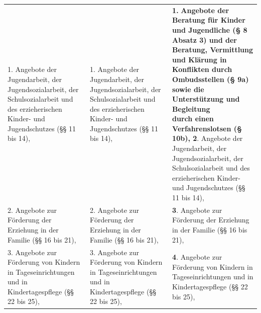 \documentclass[10pt,a4paper,landscape]{article}
\begin{document}
\begin{longtable}{|L{8.2cm}|L{8.2cm}|L{8.2cm}|}
1.  \newline Angebote der Jugendarbeit, der  \newline Jugendsozialarbeit, der Schulsozialarbeit  \newline und des erzieherischen Kinder- und  \newline Jugendschutzes (\S{}\S{} 11 bis 14), & 1.  \newline Angebote der Jugendarbeit, der  \newline Jugendsozialarbeit, der Schulsozialarbeit  \newline und des erzieherischen Kinder- und  \newline Jugendschutzes (\S{}\S{} 11 bis 14), & \textbf{1. }\textbf{\textcolor{diffgreen}{Angebote der Beratung für Kinder  \newline und Jugendliche (\S{} 8 Absatz 3) und der  \newline Beratung, Vermittlung und Klärung in  \newline Konflikten durch Ombudsstellen (\S{} 9a)  \newline sowie die Unterstützung und Begleitung  \newline durch einen Verfahrenslotsen (\S{} 10b), }} \textbf{\textcolor{diffgreen}{2}}\textcolor{diffgreen}{.}  \newline Angebote der Jugendarbeit, der  \newline Jugendsozialarbeit, der Schulsozialarbeit  \newline und des erzieherischen Kinder- und  \newline Jugendschutzes (\S{}\S{} 11 bis 14), \\
\hhline{|---|}
\textcolor{diffred}{2.}  \newline Angebote zur Förderung der Erziehung in  \newline der Familie (\S{}\S{} 16 bis 21), & \textcolor{diffred}{2.}  \newline Angebote zur Förderung der Erziehung in  \newline der Familie (\S{}\S{} 16 bis 21), & \textbf{\textcolor{diffgreen}{3}}\textcolor{diffgreen}{.}  \newline Angebote zur Förderung der Erziehung in  \newline der Familie (\S{}\S{} 16 bis 21), \\
\hhline{|---|}
\textcolor{diffred}{3.}  \newline Angebote zur Förderung von Kindern in  \newline Tageseinrichtungen und in  \newline Kindertagespflege (\S{}\S{} 22 bis 25), & \textcolor{diffred}{3.}  \newline Angebote zur Förderung von Kindern in  \newline Tageseinrichtungen und in  \newline Kindertagespflege (\S{}\S{} 22 bis 25), & \textbf{\textcolor{diffgreen}{4}}\textcolor{diffgreen}{.}  \newline Angebote zur Förderung von Kindern in  \newline Tageseinrichtungen und in  \newline Kindertagespflege (\S{}\S{} 22 bis 25), \\

\end{longtable}
\end{document}
